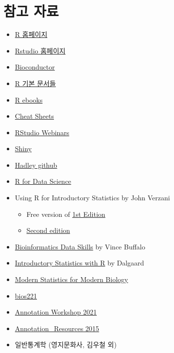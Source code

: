 \documentclass[
]{book}
\providecommand{\tightlist}{%
  \setlength{\itemsep}{0pt}\setlength{\parskip}{0pt}}
\begin{document}
\hypertarget{References}{%
\section{참고 자료}\label{References}}

\begin{itemize}
\tightlist
\item
  \href{https://www.r-project.org/}{R 홈페이지}
\item
  \href{https://www.rstudio.com/}{Rstudio 홈페이지}
\item
  \href{https://www.bioconductor.org/}{Bioconductor}
\item
  \href{https://cran.r-project.org/manuals.html}{R 기본 문서들}
\item
  \href{https://bookdown.org/}{R ebooks}
\item
  \href{https://www.rstudio.com/resources/cheatsheets/}{Cheat Sheets}
\item
  \href{https://resources.rstudio.com/}{RStudio Webinars}
\item
  \href{http://shiny.rstudio.com/tutorial/}{Shiny}
\item
  \href{https://github.com/hadley}{Hadley github}
\item
  \href{https://r4ds.had.co.nz}{R for Data Science}
\item
  Using R for Introductory Statistics by John Verzani

  \begin{itemize}
  \tightlist
  \item
    Free version of \href{https://cran.r-project.org/doc/contrib/Verzani-SimpleR.pdf}{1st Edition}
  \item
    \href{https://www.crcpress.com/Using-R-for-Introductory-Statistics-Second-Edition/Verzani/p/book/9781466590731}{Second edition}
  \end{itemize}
\item
  \href{http://2.droppdf.com/files/5aTvl/bioinformatics-data-skills.pdf}{Bioinformatics Data Skills} by Vince Buffalo
\item
  \href{http://www.academia.dk/BiologiskAntropologi/Epidemiologi/PDF/Introductory_Statistics_with_R__2nd_ed.pdf}{Introductory Statistics with R} by Dalgaard
\item
  \href{http://web.stanford.edu/class/bios221/book/index.html}{Modern Statistics for Modern Biology}
\item
  \href{https://web.stanford.edu/class/bios221/labs/}{bios221}
\item
  \href{https://jmacdon.github.io/Bioc2021Anno/articles/AnnotationWorkshop.html\#summarizedexperiment-objects-1}{Annotation Workshop 2021}
\item
  \href{https://bioconductor.org/help/course-materials/2015/BioC2015/Annotation_Resources.html}{Annotation\_Resources 2015}
\item
  일반통계학 (영지문화사, 김우철 외)
\end{itemize}
\end{document}
